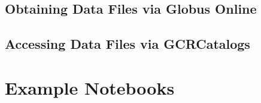 \documentclass[11pt]{report}
\begin{document}
\subsection{Obtaining Data Files via Globus Online}
\label{sec:download}

\subsection{Accessing Data Files via GCRCatalogs}
\label{sec:gcr}



\section{Example Notebooks}
\label{sec:notebooks}






\end{document}
